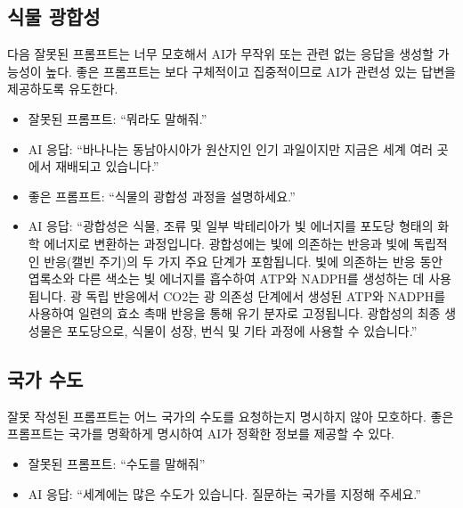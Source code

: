 \documentclass[
  letterpaper,
]{book}
\providecommand{\tightlist}{%
  \setlength{\itemsep}{0pt}\setlength{\parskip}{0pt}}\usepackage{longtable,booktabs,array}
\begin{document}
\hypertarget{uxc2dduxbb3c-uxad11uxd569uxc131}{%
\subsection{식물 광합성}\label{uxc2dduxbb3c-uxad11uxd569uxc131}}

다음 잘못된 프롬프트는 너무 모호해서 AI가 무작위 또는 관련 없는 응답을
생성할 가능성이 높다. 좋은 프롬프트는 보다 구체적이고 집중적이므로 AI가
관련성 있는 답변을 제공하도록 유도한다.

\begin{itemize}
\tightlist
\item
  잘못된 프롬프트: ``뭐라도 말해줘.''
\item
  AI 응답: ``바나나는 동남아시아가 원산지인 인기 과일이지만 지금은 세계
  여러 곳에서 재배되고 있습니다.''
\end{itemize}

\begin{itemize}
\tightlist
\item
  좋은 프롬프트: ``식물의 광합성 과정을 설명하세요.''
\item
  AI 응답: ``광합성은 식물, 조류 및 일부 박테리아가 빛 에너지를 포도당
  형태의 화학 에너지로 변환하는 과정입니다. 광합성에는 빛에 의존하는
  반응과 빛에 독립적인 반응(캘빈 주기)의 두 가지 주요 단계가 포함됩니다.
  빛에 의존하는 반응 동안 엽록소와 다른 색소는 빛 에너지를 흡수하여
  ATP와 NADPH를 생성하는 데 사용됩니다. 광 독립 반응에서 CO2는 광 의존성
  단계에서 생성된 ATP와 NADPH를 사용하여 일련의 효소 촉매 반응을 통해
  유기 분자로 고정됩니다. 광합성의 최종 생성물은 포도당으로, 식물이
  성장, 번식 및 기타 과정에 사용할 수 있습니다.''
\end{itemize}

\hypertarget{uxad6duxac00-uxc218uxb3c4}{%
\subsection{국가 수도}\label{uxad6duxac00-uxc218uxb3c4}}

잘못 작성된 프롬프트는 어느 국가의 수도를 요청하는지 명시하지 않아
모호하다. 좋은 프롬프트는 국가를 명확하게 명시하여 AI가 정확한 정보를
제공할 수 있다.

\begin{itemize}
\tightlist
\item
  잘못된 프롬프트: ``수도를 말해줘''
\item
  AI 응답: ``세계에는 많은 수도가 있습니다. 질문하는 국가를 지정해
  주세요.''
\end{itemize}
\end{document}
